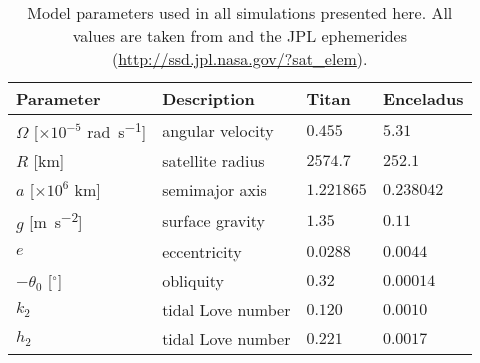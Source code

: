 \begin{table}[!t]
\scriptsize
\centering
\begin{tabularx}{0.51\linewidth}{p{1.8cm} p{2cm} p{1cm} p{1.2cm}}
 \toprule
Parameter & Description & Titan & Enceladus\\
 \midrule \midrule
$\Omega$ [$\times 10^{-5}$ \si{\radian\per\second}]	& angular velocity 		& $0.455$ & $5.31 $ \\
$R$ [\si{\kilo\metre}]				& satellite radius 		& $2574.7$ & $252.1$\\
$a$ [$\times 10^6$ \si{\kilo\metre}]				& semimajor axis 		& $1.221865$ & $0.238042$\\
$g$ [\si{\metre\per\second\squared}]		& surface gravity 		& $1.35$ & $0.11$\\
$e$ 								& eccentricity 			& $0.0288$ & $0.0044$\\
$-\theta_0$ [$^{\circ}$] 			& obliquity 			& $0.32$ & $0.00014$\\
$k_2$ 								& tidal Love number 	& $0.120$ & $0.0010$\\
$h_2$ 								& tidal Love number 	& $0.221$ & $0.0017$\\
 \bottomrule
\end{tabularx}
\caption{Model parameters used in all simulations presented here. All values are taken from \citet{zebker2009size,chen2013tidal,matsuyama2014tidal} and the JPL ephemerides (\url{http://ssd.jpl.nasa.gov/?sat_elem}).  \label{tb:param}}
\end{table}